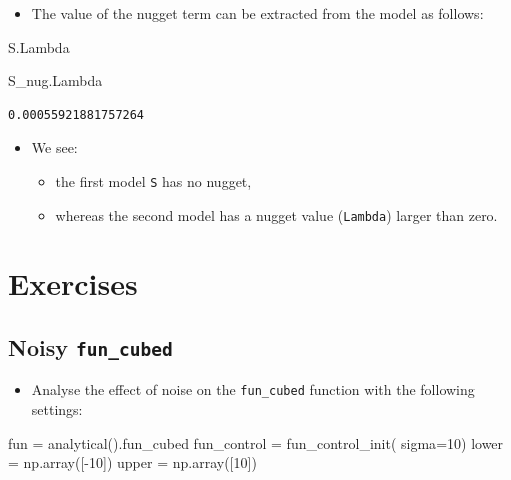 \documentclass[
  letterpaper,
  DIV=11,
  numbers=noendperiod]{scrreprt}
\newenvironment{Shaded}{\begin{snugshade}}{\end{snugshade}}
\newcommand{\DecValTok}[1]{\textcolor[rgb]{0.68,0.00,0.00}{#1}}
\newcommand{\NormalTok}[1]{\textcolor[rgb]{0.00,0.23,0.31}{#1}}
\newcommand{\OperatorTok}[1]{\textcolor[rgb]{0.37,0.37,0.37}{#1}}
\providecommand{\tightlist}{%
  \setlength{\itemsep}{0pt}\setlength{\parskip}{0pt}}\usepackage{longtable,booktabs,array}
\begin{document}
\begin{itemize}
\tightlist
\item
  The value of the nugget term can be extracted from the model as
  follows:
\end{itemize}

\begin{Shaded}
\begin{Highlighting}[]
\NormalTok{S.Lambda}
\end{Highlighting}
\end{Shaded}

\begin{Shaded}
\begin{Highlighting}[]
\NormalTok{S\_nug.Lambda}
\end{Highlighting}
\end{Shaded}

\begin{verbatim}
0.00055921881757264
\end{verbatim}

\begin{itemize}
\tightlist
\item
  We see:

  \begin{itemize}
  \tightlist
  \item
    the first model \texttt{S} has no nugget,
  \item
    whereas the second model has a nugget value (\texttt{Lambda}) larger
    than zero.
  \end{itemize}
\end{itemize}

\section{Exercises}\label{exercises-6}

\subsection{\texorpdfstring{Noisy
\texttt{fun\_cubed}}{Noisy fun\_cubed}}\label{noisy-fun_cubed}

\begin{itemize}
\tightlist
\item
  Analyse the effect of noise on the \texttt{fun\_cubed} function with
  the following settings:
\end{itemize}

\begin{Shaded}
\begin{Highlighting}[]
\NormalTok{fun }\OperatorTok{=}\NormalTok{ analytical().fun\_cubed}
\NormalTok{fun\_control }\OperatorTok{=}\NormalTok{ fun\_control\_init(}
\NormalTok{    sigma}\OperatorTok{=}\DecValTok{10}\NormalTok{)}
\NormalTok{lower }\OperatorTok{=}\NormalTok{ np.array([}\OperatorTok{{-}}\DecValTok{10}\NormalTok{])}
\NormalTok{upper }\OperatorTok{=}\NormalTok{ np.array([}\DecValTok{10}\NormalTok{])}
\end{Highlighting}
\end{Shaded}
\end{document}
